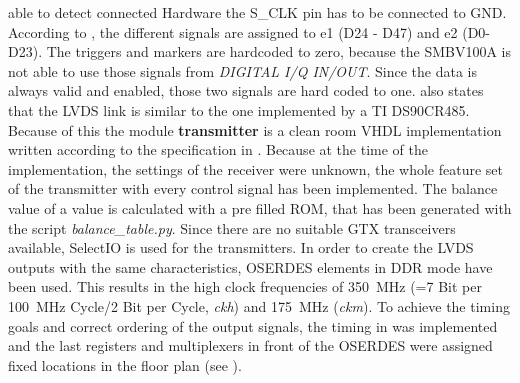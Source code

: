 \documentclass[11pt,technote,a4paper,twocolumn]{IEEEtran}
\newcommand{\signal}[1]{{\ttfamily #1}}
\newcommand{\module}[1]{{\ttfamily\bfseries #1}}
\newcommand{\clk}[1]{{\itshape\ttfamily #1}}
\begin{document}
able to detect connected Hardware the S\_CLK pin has to be connected to GND.
According to \cite[p. 10]{fsq_b17}, the different signals are assigned to
\signal{e1} (D24 - D47) and \signal{e2} (D0-D23). The triggers and markers are
hardcoded to zero, because the SMBV100A is not able to use those signals from
\emph{DIGITAL I/Q IN/OUT}. Since the data is always valid and enabled, those two
signals are hard coded to one. \cite[p. 10]{fsq_b17} also states that the LVDS
link is similar to the one implemented by a TI DS90CR485. Because of this the module
\module{transmitter} is a clean room VHDL implementation written according to
the specification in \cite{ds90cr485}. Because at the time of the implementation,
the settings of the receiver were unknown, the whole feature set of the
transmitter with every control signal has been implemented. The balance value
of a value is calculated with a pre filled ROM, that has been generated with
the script \emph{balance\_table.py}. Since there are no suitable GTX
transceivers \cite{gtx} available, SelectIO\cite[p. 270ff]{virtex5} is used
for the transmitters. In order to create the LVDS outputs with the same
characteristics, OSERDES \cite[p. 370ff]{virtex5} elements in
DDR mode have been used. This results in the high clock frequencies of
\SI{350}{MHz} (=7 Bit per \SI{100}{MHz} Cycle/2 Bit per Cycle, \clk{ckh}) and
\SI{175}{MHz} (\clk{ckm}). To achieve the timing goals and correct ordering
of the output signals, the timing in  was implemented and the
last registers and multiplexers in front of the OSERDES
\cite[p. 370ff]{virtex5} were assigned fixed locations in the floor plan
(see ).
\end{document}

